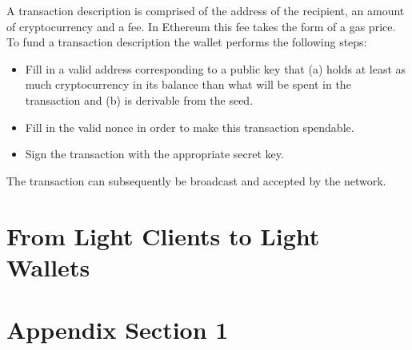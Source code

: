 \documentclass[sigconf]{acmart}
\begin{document}
A transaction description is comprised of the address of the recipient, an amount of cryptocurrency and a fee. In Ethereum this fee takes the form of a gas price.
To fund a transaction description the wallet performs the following steps:

\begin{itemize}
    \item Fill in a valid address corresponding to a public key that (a) holds at least as much cryptocurrency in its balance than what will be spent in the transaction and (b) is derivable from the seed.
    \item Fill in the valid nonce in order to make this transaction spendable.
    \item Sign the transaction with the appropriate secret key.
\end{itemize}

The transaction can subsequently be broadcast and accepted by the network.

\section{From Light Clients to Light Wallets}

\begin{acks}
\end{acks}




\appendix

\section{Appendix Section 1}
\end{document}
